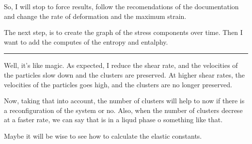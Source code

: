 \documentclass[a4paper, 11pt, oneside]{researchjournal} %
\begin{document}
So, I will stop to force results, follow the recomendations of the documentation and change the rate of deformation and the maximum strain.


The next step, is to create the graph of the stress components over time.
Then I want to add the computes of the entropy and entalphy.

\rule{\textwidth}{0.4pt}

Well, it's like magic.
As expected, I reduce the shear rate, and the velocities of the particles slow down and the clusters are preserved.
At higher shear rates, the velocities of the particles goes high, and the clusters are no longer preserved.

Now, taking that into account, the number of clusters will help to now if there is a reconfiguration of the system or no.
Also, when the number of clusters decrese at a faster rate, we can say that is in a liqud phase o something like that.

Maybe it will be wise to see how to calculate the elastic constants.


\end{document}

